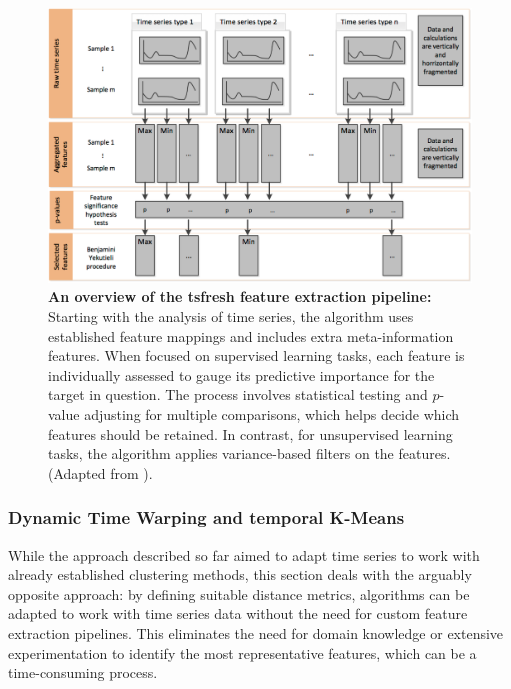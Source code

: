 \begin{figure}[!thb]
\centering
\includegraphics[width=\textwidth]{Figures/sota_2.pdf}

\caption[\textbf{An overview of the tsfresh feature extraction pipeline}]{\textbf{An overview of the tsfresh feature extraction pipeline:} Starting with the analysis of time series, the algorithm uses established feature mappings and includes extra meta-information features. When focused on supervised learning tasks, each feature is individually assessed to gauge its predictive importance for the target in question. The process involves statistical testing and $p$-value adjusting for multiple comparisons, which helps decide which features should be retained. In contrast, for unsupervised learning tasks, the algorithm applies variance-based filters on the features. (Adapted from \cite{Christ2018TimePackage}).}
\label{fig:2.2}

\end{figure}

\subsubsection{Dynamic Time Warping and temporal K-Means}

While the approach described so far aimed to adapt time series to work with already established clustering methods, this section deals with the arguably opposite approach: by defining suitable distance metrics, algorithms can be adapted to work with time series data without the need for custom feature extraction pipelines. This eliminates the need for domain knowledge or extensive experimentation to identify the most representative features, which can be a time-consuming process.

